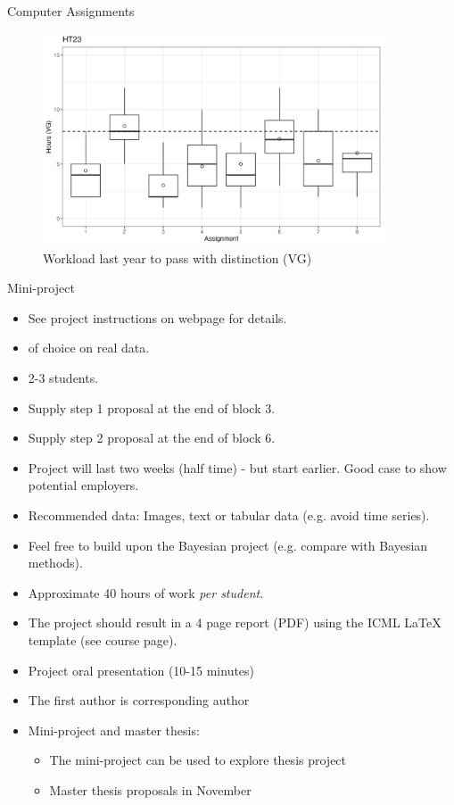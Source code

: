 \documentclass[10pt]{beamer}
\begin{document}
\begin{frame}{Computer Assignments}

\begin{figure}[h]
\caption{Workload last year to pass with distinction (VG)}
\centering
\includegraphics[width=0.9\textwidth]{figs/VG.png}
\end{figure}

\end{frame}


\begin{frame}{Mini-project}

\begin{itemize}
\item See project instructions on webpage for details.\pause
\item {} of choice on real data.
\item 2-3 students.\pause
\item Supply step 1 proposal at the end of block 3.\pause
\item Supply step 2 proposal at the end of block 6.\pause
\item Project will last two weeks (half time) - but start earlier. Good case to show potential employers.
\item Recommended data: Images, text or tabular data (e.g. avoid time series).
\item Feel free to build upon the Bayesian project (e.g. compare with Bayesian methods).
\item Approximate 40 hours of work \emph{per student}.\pause
\item The project should result in a 4 page report (PDF) using the ICML LaTeX template (see course page).
\item Project oral presentation (10-15 minutes)\pause
\item The first author is corresponding author\pause
\item Mini-project and master thesis:
\begin{itemize}
\item The mini-project can be used to explore thesis project
\item Master thesis proposals in November
\end{itemize}
\end{itemize}
\end{frame}
\end{document}
